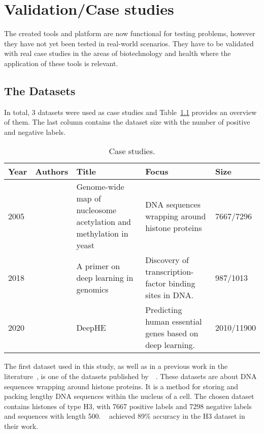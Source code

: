 \chapter{Validation/Case studies}

The created tools and platform are now functional for testing problems, however they have not yet been tested in real-world scenarios. They have to be validated with real case studies in the areas of biotechnology and health where the application of these tools is relevant.

\section{The Datasets}

In total, 3 datasets were used as case studies and Table~\ref{tab:case_studies} provides an overview of them. The last column contains the dataset size with the number of positive and negative labels.

\begin{table}[ht]
	\caption{Case studies.}
	\label{tab:case_studies}
    \centering
    \begin{tabular}{lp{2cm}p{3.5cm}p{5.5cm}l}
    	\toprule
    	\textbf{Year} & \textbf{Authors} & \textbf{Title} & \textbf{Focus} & \textbf{Size}\\\midrule
    	
    	2005 & \citeauthor{Pokholok2005Genome-wideYeast} & Genome-wide map of nucleosome acetylation and methylation in yeast~\cite{Pokholok2005Genome-wideYeast} & \gls{DNA} sequences wrapping around histone proteins & 7667/7296\\\midrule
    	
        2018 & \citeauthor{Zou2018AGenomics} & A primer on deep learning in genomics~\cite{Zou2018AGenomics} & Discovery of transcription-factor binding sites in \gls{DNA}. & 987/1013\\\midrule
        
        2020 & \citeauthor{Zhang2020DeepHE:Learning} & DeepHE~\cite{Zhang2020DeepHE:Learning} & Predicting human essential genes based on deep learning. & 2010/11900\\
        
    	\bottomrule
    \end{tabular}
\end{table}

The first dataset used in this study, as well as in a previous work in the literature~\cite{Nguyen2016DNANetwork}, is one of the datasets published by~\citeauthor{Pokholok2005Genome-wideYeast}~\cite{Pokholok2005Genome-wideYeast}. These datasets are about \gls{DNA} sequences wrapping around histone proteins. It is a method for storing and packing lengthy \gls{DNA} sequences within the nucleus of a cell. The chosen dataset contains histones of type H3, with 7667 positive labels and 7298 negative labels and sequences with length 500. \citeauthor{Nguyen2016DNANetwork}~\cite{Nguyen2016DNANetwork} achieved 89\% accuracy in the H3 dataset in their work.


